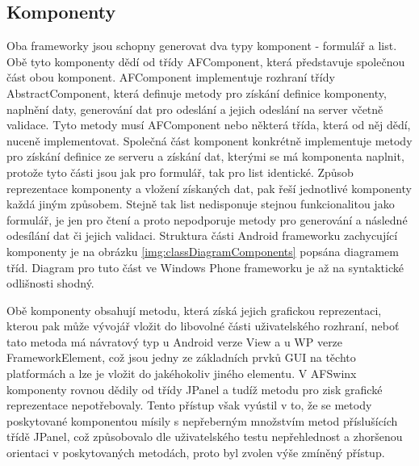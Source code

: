 \subsection{Komponenty}
Oba frameworky jsou schopny generovat dva typy komponent - formulář a list. Obě tyto komponenty dědí od třídy AFComponent, která představuje společnou část obou komponent. AFComponent implementuje rozhraní třídy AbstractComponent, která definuje metody pro získání definice komponenty, naplnění daty, generování dat pro odeslání a jejich odeslání na server včetně validace. Tyto metody musí AFComponent nebo některá třída, která od něj dědí, nuceně implementovat. Společná část komponent konkrétně implementuje metody pro získání definice ze serveru a získání dat, kterými se má komponenta naplnit, protože tyto části jsou jak pro formulář, tak pro list identické. Způsob reprezentace komponenty a vložení získaných dat, pak řeší jednotlivé komponenty každá jiným způsobem. Stejně tak list nedisponuje stejnou funkcionalitou jako formulář, je jen pro čtení a proto nepodporuje metody pro generování a následné odesílání dat či jejich validaci. Struktura části Android frameworku zachycující komponenty je na obrázku \ref{img:classDiagramComponents} popsána diagramem tříd. Diagram pro tuto část ve Windows Phone frameworku je až na syntaktické odlišnosti shodný.  

Obě komponenty obsahují metodu, která získá jejich grafickou reprezentaci, kterou pak může vývojář vložit do libovolné části uživatelského rozhraní, neboť tato metoda má návratový typ u Android verze View a u WP verze FrameworkElement, což jsou jedny ze základních prvků GUI na těchto platformách a lze je vložit do jakéhokoliv jiného elementu. V AFSwinx \cite{tomasek-thesis} komponenty rovnou dědily od třídy JPanel a tudíž metodu pro zisk grafické reprezentace nepotřebovaly. Tento přístup však vyústil v to, že se metody poskytované komponentou mísily s nepřeberným množstvím metod příslušících třídě JPanel, což způsobovalo dle uživatelského testu nepřehlednost a zhoršenou orientaci v poskytovaných metodách, proto byl zvolen výše zmíněný přístup. 

